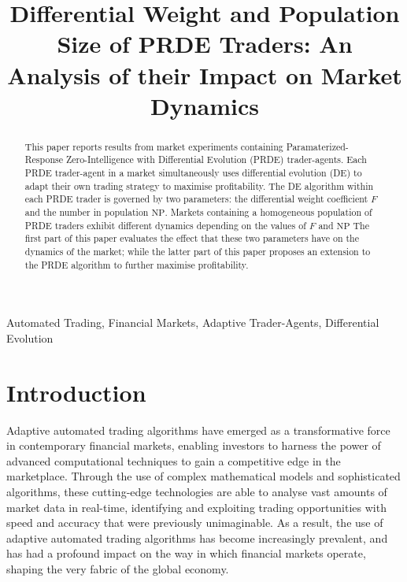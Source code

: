 \documentclass[conference]{IEEEtran}
\begin{document}
\title{Differential Weight and Population Size of PRDE Traders: An Analysis of their Impact on Market Dynamics}

\author{
}

\maketitle

\begin{abstract}
This paper reports results from market experiments containing Paramaterized-Response Zero-Intelligence with Differential Evolution (PRDE) trader-agents.
Each PRDE trader-agent in a market simultaneously uses differential evolution (DE) to adapt their own trading strategy to maximise profitability.
The DE algorithm within each PRDE trader is governed by two parameters: the differential weight coefficient $F$ and the number in population $\mathrm{NP}$.
Markets containing a homogeneous population of PRDE traders exhibit different dynamics depending on the values of $F$ and $\mathrm{NP}$
The first part of this paper evaluates the effect that these two parameters have on the dynamics of the market; while the latter part of this paper proposes an extension to the PRDE algorithm to further maximise profitability.
\end{abstract}

\begin{IEEEkeywords}
Automated Trading, Financial Markets, Adaptive Trader-Agents, Differential Evolution
\end{IEEEkeywords}

\section{Introduction}

Adaptive automated trading algorithms have emerged as a transformative force in contemporary financial markets, enabling investors to harness the power of advanced computational techniques to gain a competitive edge in the marketplace.
Through the use of complex mathematical models and sophisticated algorithms, these cutting-edge technologies are able to analyse vast amounts of market data in real-time, identifying and exploiting trading opportunities with speed and accuracy that were previously unimaginable.
As a result, the use of adaptive automated trading algorithms has become increasingly prevalent, and has had a profound impact on the way in which financial markets operate, shaping the very fabric of the global economy.
\end{document}
